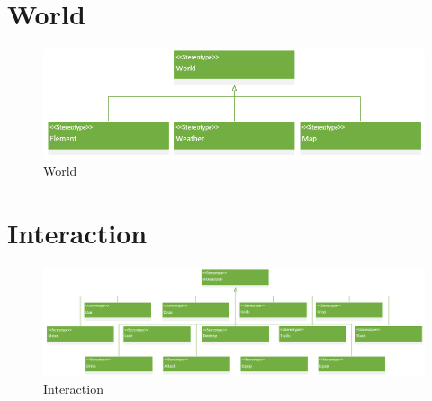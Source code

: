 \section{World}
\begin{figure}[H]
    \begin{center}
    \includegraphics[width=14cm]{10_img/Z_annexeA/world.PNG}
    \caption{World}
    \label{A-World}
    \end{center}
\end{figure}


\section{Interaction}
\begin{figure}[H]
    \begin{center}
    \includegraphics[width=\linewidth]{10_img/Z_annexeA/interaction.PNG} 
    \caption{Interaction}
    \label{A-Interaction}
    \end{center}
\end{figure}
